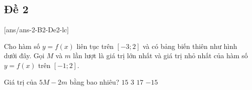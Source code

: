 \subsection{Đề 2}
[ans/ans-2-B2-De2-lc]
\caulc
\begin{ex}%
	Cho hàm số $y=f(x)$ liên tục trên $[-3 ; 2]$ và có bảng biến thiên như hình dưới đây. Gọi $M$ và $m$ lần lượt là giá trị lớn nhất và giá trị nhỏ nhất của hàm số $y=f(x)$ trên $[-1 ; 2]$.
	\begin{center}
	\end{center}
	Giá trị của $5M-2m$ bằng bao nhiêu?
	\choice
	{\True $15$}
	{$3$}
	{$17$}
	{$-15$}
\end{ex}

